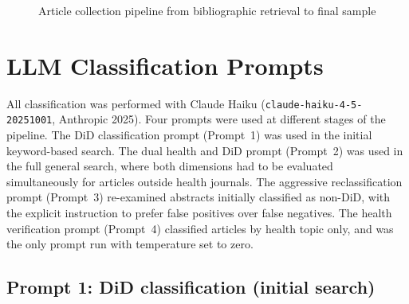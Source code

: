 \begin{landscape}
\begin{figure}[p]

\caption{Article collection pipeline from bibliographic
         retrieval to final sample}
\label{fig:collection_pipeline}
\end{figure}
\end{landscape}


\section{LLM Classification Prompts}

All classification was performed with Claude Haiku (\texttt{claude-haiku-4-5-20251001}, Anthropic 2025). Four prompts were used at different stages of the pipeline. The DiD classification prompt (Prompt~1) was used in the initial keyword-based search. The dual health and DiD prompt (Prompt~2) was used in the full general search, where both dimensions had to be evaluated simultaneously for articles outside health journals. The aggressive reclassification prompt (Prompt~3) re-examined abstracts initially classified as non-DiD, with the explicit instruction to prefer false positives over false negatives. The health verification prompt (Prompt~4) classified articles by health topic only, and was the only prompt run with temperature set to zero.

\subsection*{Prompt 1: DiD classification (initial search)}


